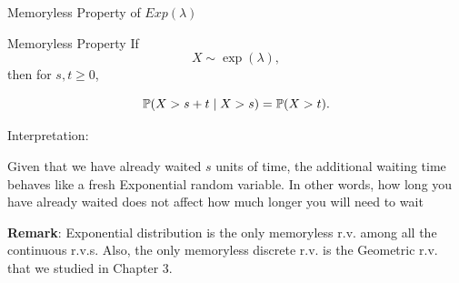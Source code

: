 \begin{frame}{Memoryless Property of $Exp(\lambda)$}
\begin{keybox}{Memoryless Property}
If
\[
X\sim \operatorname{exp}(\lambda),
\]
then for $s,t\geq0$,

\[
{
\mathbb{P}(X>s+t\mid X>s)=\mathbb{P}(X>t).
}
\]
\end{keybox}

\vspace{0.25cm}

Interpretation:

Given that we have already waited $s$ units of time, the additional waiting time behaves like a fresh Exponential random variable. In other words, how long you have already waited does not affect how much longer you will need to wait

\textbf{Remark}: Exponential distribution is the only memoryless r.v. among all the continuous r.v.s. Also, the only memoryless discrete r.v. is the Geometric r.v. that we studied in Chapter 3. 
\end{frame}

